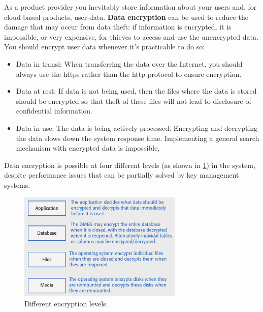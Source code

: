 \documentclass[10pt,a4paper]{report}
\begin{document}
As a product provider you inevitably store information about your users and, for cloud-based products, user data. \textbf{Data encryption} can be used to reduce the damage that may occur from data
theft: if information is encrypted, it is impossible, or very expensive, for thieves to access and use the unencrypted data. You should encrypt user data whenever it's practicable to do so:
\begin{itemize}
	\item Data in transi: When transferring the data over the Internet, you should always use the https rather
	than the http protocol to ensure encryption.
	\item Data at rest: If data is not being used, then the files where the data is stored should be encrypted
	so that theft of these files will not lead to disclosure of confidential information.
	\item Data in use: The data is being actively processed. Encrypting and decrypting the data slows
	down the system response time. Implementing a general search mechanism with
	encrypted data is impossible,
\end{itemize}
Data encryption is possible at four different levels (as shown in \ref{image92}) in the system, despite performance issues that can be partially solved by key management systems.
\begin{figure}[h]
	\centering
	\includegraphics[width=0.7\textwidth]{image92}
	\caption{Different encryption levels}
	\label{image92}
\end{figure} 
\end{document}
